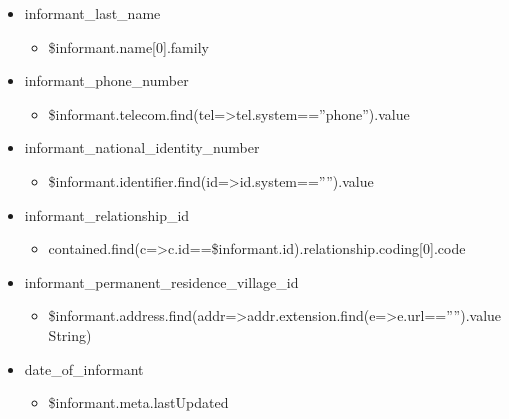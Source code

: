 \documentclass[letterpaper,10pt,english]{sphinxmanual}
\begin{document}
\begin{itemize}
\begin{itemize}
\end{itemize}

\item {} 
\sphinxAtStartPar
informant\_last\_name
\begin{itemize}
\item {} 
\sphinxAtStartPar
\$informant.name{[}0{]}.family

\end{itemize}

\item {} 
\sphinxAtStartPar
informant\_phone\_number
\begin{itemize}
\item {} 
\sphinxAtStartPar
\$informant.telecom.find(tel=\textgreater{}tel.system==”phone”).value

\end{itemize}

\item {} 
\sphinxAtStartPar
informant\_national\_identity\_number
\begin{itemize}
\item {} 
\sphinxAtStartPar
\$informant.identifier.find(id=\textgreater{}id.system==””).value

\end{itemize}

\item {} 
\sphinxAtStartPar
informant\_relationship\_id
\begin{itemize}
\item {} 
\sphinxAtStartPar
contained.find(c=\textgreater{}c.id==\$informant.id).relationship.coding{[}0{]}.code

\end{itemize}

\item {} 
\sphinxAtStartPar
informant\_permanent\_residence\_village\_id
\begin{itemize}
\item {} 
\sphinxAtStartPar
\$informant.address.find(addr=\textgreater{}addr.extension.find(e=\textgreater{}e.url==””).valueString)

\end{itemize}

\item {} 
\sphinxAtStartPar
date\_of\_informant
\begin{itemize}
\item {} 
\sphinxAtStartPar
\$informant.meta.lastUpdated


\end{itemize}
\end{itemize}
\end{document}
